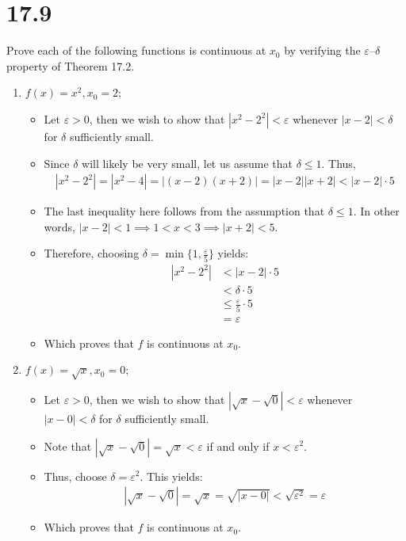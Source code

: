 \documentclass[10pt,a4paper]{article}
\theoremstyle{definition}
\begin{document}
\section*{17.9}
Prove each of the following functions is continuous at $x_0$ by verifying the $\varepsilon$--$\delta$ property of Theorem 17.2.
\begin{enumerate}[label = (\alph*)]
\item $f(x) = x^2, x_0 = 2$;
	\begin{itemize}
	\item Let $\varepsilon > 0$, then we wish to show that $|x^2 - 2^2| < \varepsilon$ whenever $|x - 2| < \delta$ for $\delta$ sufficiently small. 
	\item Since $\delta$ will likely be very small, let us assume that $\delta \leq 1$. Thus, 
	\begin{align*}
	|x^2 - 2^2| = |x^2 - 4| = |(x - 2)(x + 2)| = |x - 2||x + 2| < |x - 2|\cdot 5
	\end{align*}
	\item The last inequality here follows from the assumption that $\delta \leq 1$. In other words, $|x - 2| < 1 \implies 1 < x < 3 \implies |x + 2| < 5$.
	\item Therefore, choosing $\delta = \min\{1, \frac{\varepsilon}{5}\}$ yields:
	\begin{align*}
	|x^2 - 2^2| &< |x - 2| \cdot 5\\
	&< \delta \cdot 5\\
	&\leq \frac{\varepsilon}{5} \cdot 5\\
	&= \varepsilon
	\end{align*}
	\item Which proves that $f$ is continuous at $x_0$.
	\end{itemize}
\item $f(x) = \sqrt{x}, x_0 = 0$;
	\begin{itemize}
	\item Let $\varepsilon > 0$, then we wish to show that $|\sqrt{x} - \sqrt{0}| < \varepsilon$ whenever $|x - 0| < \delta$ for $\delta$ sufficiently small. 
	\item Note that $|\sqrt{x} - \sqrt{0}| = \sqrt{x} < \varepsilon$ if and only if $x < \varepsilon^2$.
	\item Thus, choose $\delta = \varepsilon^2$. This yields:
	\begin{align*}
	|\sqrt{x} - \sqrt{0}| = \sqrt{x} = \sqrt{|x - 0|} < \sqrt{\varepsilon^2} = \varepsilon
	\end{align*}
	\item Which proves that $f$ is continuous at $x_0$.

\end{itemize}
\end{enumerate}
\end{document}
